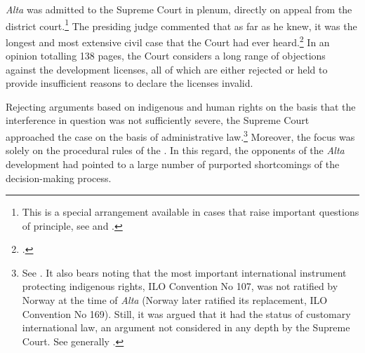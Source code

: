 {\it Alta} was admitted to the Supreme Court in plenum, directly on appeal from the district court.\footnote{This is a special arrangement available in cases that raise important questions of principle, see \cite[30-2]{cda05} and \cite[5]{ca15}.} The presiding judge commented that as far as he knew, it was the longest and most extensive civil case that the Court had ever heard.\footcite[254]{alta82} In an opinion totalling 138 pages, the Court considers a long range of objections against the development licenses, all of which are either rejected or held to provide insufficient reasons to declare the licenses invalid.


Rejecting arguments based on indigenous and human rights on the basis that the interference in question was not sufficiently severe, the Supreme Court approached the case on the basis of administrative law.\footnote{See \cite[351-352]{eckhoff82}. It also bears noting that the most important international instrument protecting indigenous rights, ILO Convention No 107, was not ratified by Norway at the time of {\it Alta} (Norway later ratified its replacement, ILO Convention No 169). Still, it was argued that it had the status of customary international law, an argument not considered in any depth by the Supreme Court. See generally \cite{eide80}.} Moreover, the focus was solely on the procedural rules of the \cite{wra17}. In this regard, the opponents of the {\it Alta} development had pointed to a large number of purported shortcomings of the decision-making process. 

